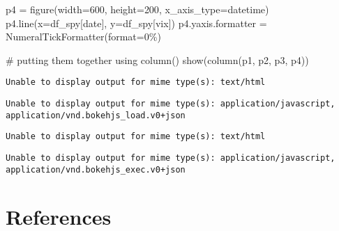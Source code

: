 \documentclass[
  letterpaper,
  DIV=11,
  numbers=noendperiod]{scrreprt}
\newenvironment{Shaded}{\begin{snugshade}}{\end{snugshade}}
\newcommand{\BuiltInTok}[1]{\textcolor[rgb]{0.00,0.23,0.31}{#1}}
\newcommand{\CommentTok}[1]{\textcolor[rgb]{0.37,0.37,0.37}{#1}}
\newcommand{\DecValTok}[1]{\textcolor[rgb]{0.68,0.00,0.00}{#1}}
\newcommand{\NormalTok}[1]{\textcolor[rgb]{0.00,0.23,0.31}{#1}}
\newcommand{\OperatorTok}[1]{\textcolor[rgb]{0.37,0.37,0.37}{#1}}
\newcommand{\StringTok}[1]{\textcolor[rgb]{0.13,0.47,0.30}{#1}}
\newlength{\cslhangindent}
\newlength{\cslentryspacingunit} %
\newenvironment{CSLReferences}[2] %
 {%
  \setlength{\parindent}{0pt}
  \ifodd #1
  \let\oldpar\par
  \def\par{\hangindent=\cslhangindent\oldpar}
  \fi
  \setlength{\parskip}{#2\cslentryspacingunit}
 }%
 {}
\begin{document}
\begin{Shaded}
\begin{Highlighting}[]
\NormalTok{p4 }\OperatorTok{=}\NormalTok{ figure(width}\OperatorTok{=}\DecValTok{600}\NormalTok{, height}\OperatorTok{=}\DecValTok{200}\NormalTok{, x\_axis\_type}\OperatorTok{=}\StringTok{\textquotesingle{}datetime\textquotesingle{}}\NormalTok{)}
\NormalTok{p4.line(x}\OperatorTok{=}\NormalTok{df\_spy[}\StringTok{\textquotesingle{}date\textquotesingle{}}\NormalTok{], y}\OperatorTok{=}\NormalTok{df\_spy[}\StringTok{\textquotesingle{}vix\textquotesingle{}}\NormalTok{])}
\NormalTok{p4.yaxis.formatter }\OperatorTok{=}\NormalTok{ NumeralTickFormatter(}\BuiltInTok{format}\OperatorTok{=}\StringTok{\textquotesingle{}0\%\textquotesingle{}}\NormalTok{)}

\CommentTok{\# putting them together using column()}
\NormalTok{show(column(p1, p2, p3, p4))}
\end{Highlighting}
\end{Shaded}

\begin{verbatim}
Unable to display output for mime type(s): text/html
\end{verbatim}

\begin{verbatim}
Unable to display output for mime type(s): application/javascript, application/vnd.bokehjs_load.v0+json
\end{verbatim}

\begin{verbatim}
Unable to display output for mime type(s): text/html
\end{verbatim}

\begin{verbatim}
Unable to display output for mime type(s): application/javascript, application/vnd.bokehjs_exec.v0+json
\end{verbatim}


\hypertarget{references}{%
\chapter*{References}\label{references}}


\hypertarget{refs}{}
\begin{CSLReferences}{0}{0}
\end{CSLReferences}
\end{document}

